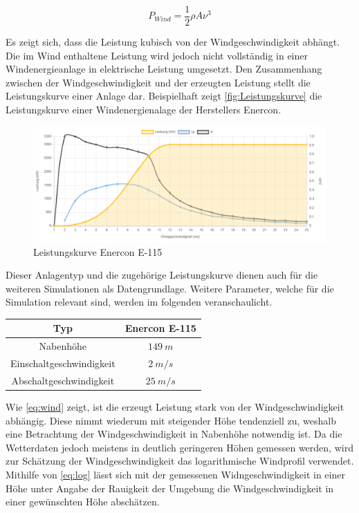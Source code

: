 \begin{equation}
	P_{Wind} = \frac{1}{2}\rho A \nu^3
\end{equation}

Es zeigt sich, dass die Leistung kubisch von der Windgeschwindigkeit abhängt. Die im Wind enthaltene Leistung wird jedoch nicht vollständig in einer Windenergieanlage in elektrische Leistung umgesetzt. Den Zusammenhang zwischen der Windgeschwindigkeit und der erzeugten Leistung stellt die Leistungskurve einer Anlage dar. Beispielhaft zeigt \autoref{fig:Leistungskurve} die Leistungskurve einer Windenergienalage der Herstellers Enercon. 

\begin{figure}[H]
	\centering
	\includegraphics[width=0.9\linewidth]{Abbildungen/Enercon E115.png}
	\caption{Leistungskurve Enercon E-115 \cite{E115}}
	\label{fig:Leistungskurve}
\end{figure}

Dieser Anlagentyp und die zugehörige Leistungskurve dienen auch für die weiteren Simulationen als Datengrundlage. Weitere Parameter, welche für die Simulation relevant sind, werden im folgenden veranschaulicht.

\begin{center}
	\begin{tabular}[htpb]{c|c}
		Typ & Enercon E-115 \\
		\hline
		Nabenhöhe & $149~m$ \\
		Einschaltgeschwindigkeit & $2~m/s$ \\
		Abschaltgeschwindigkeit & $25~m/s$
	\end{tabular}
\end{center}

Wie \autoref{eq:wind} zeigt, ist die erzeugt Leistung stark von der Windgeschwindigkeit abhängig. Diese nimmt wiederum mit steigender Höhe tendenziell zu, weshalb eine Betrachtung der Windgeschwindigkeit in Nabenhöhe notwendig ist. Da die Wetterdaten jedoch meistens in deutlich geringeren Höhen gemessen werden, wird zur Schätzung der Windgeschwindigkeit das logarithmische Windprofil verwendet. Mithilfe von \autoref{eq:log} lässt sich mit der gemessenen Widngeschwindigkeit in einer Höhe unter Angabe der Rauigkeit der Umgebung die Windgeschwindigkeit in einer gewünschten Höhe abschätzen. \cite{Hoehenprofil}

